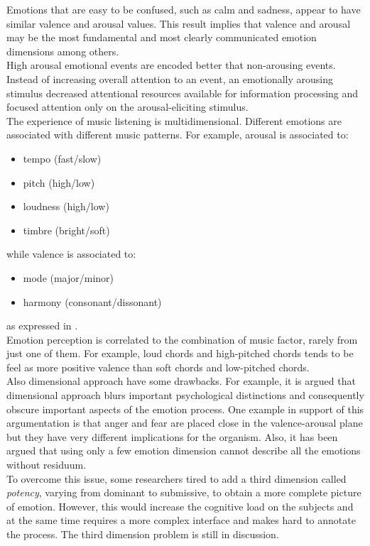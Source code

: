 Emotions that are easy to be confused, such as calm and sadness, appear to have similar valence and arousal values. This result implies that valence and arousal may be the most fundamental and most clearly communicated emotion dimensions among others.
\\
High arousal emotional events are encoded better that non-arousing events. Instead of increasing overall attention to an event, an emotionally arousing stimulus decreased attentional resources available for information processing and focused attention only on the arousal-eliciting stimulus.
\\ \indent
The experience of music listening is multidimensional. Different emotions are associated with different music patterns. For example, arousal is associated to:
\begin{itemize}
	\item tempo (fast/slow)
	\item pitch (high/low)
	\item loudness (high/low)
	\item timbre (bright/soft)
\end{itemize}
while valence is associated to:
\begin{itemize}
	\item mode (major/minor)
	\item harmony (consonant/dissonant)
\end{itemize}
as expressed in \cite{gabrielsson2001influence}.
\\
Emotion perception is correlated to the combination of music factor, rarely from just one of them. For example, loud chords and high-pitched chords tends to be feel as more positive valence than soft chords and low-pitched chords.
\\ \indent
Also dimensional approach have some drawbacks. For example, it is argued that dimensional approach blurs important psychological distinctions and consequently obscure important aspects of the emotion process. One example in support of this argumentation is that anger and fear are placed close in the valence-arousal plane but they have very different implications for the organism. Also, it has been argued that using only a few emotion dimension cannot describe all the emotions without residuum.
\\
To overcome this issue, some researchers tired to add a third dimension called \textit{potency}, varying from dominant to submissive, to obtain a more complete picture of emotion. However, this would increase the cognitive load on the subjects and at the same time requires a more complex interface and makes hard to annotate the process. The third dimension problem is still in discussion.

